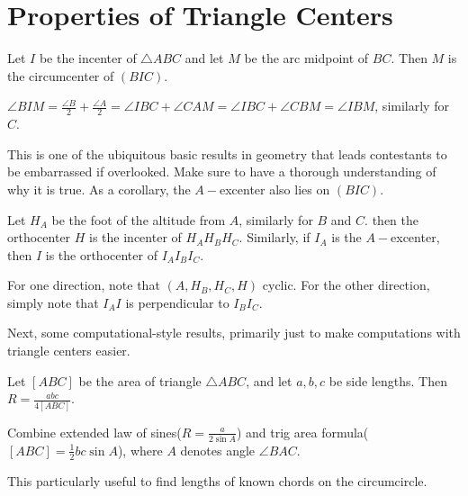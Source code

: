 \documentclass[mast]{lucky}
\begin{document}
\section{Properties of Triangle Centers}
\begin{theo}[Fact 5]
Let $I$ be the incenter of $\triangle ABC$ and let $M$ be the arc midpoint of $BC$. Then $M$ is the circumcenter of $(BIC)$.
\end{theo}
\begin{pro}
$\angle BIM = \frac{\angle B}2 + \frac{\angle A}2 = \angle IBC + \angle CAM = \angle IBC + \angle CBM = \angle IBM$, similarly for $C$.
\end{pro}
This is one of the ubiquitous basic results in geometry that leads contestants to be embarrassed if overlooked. Make sure to have a thorough understanding of why it is true. As a corollary, the $A-$excenter also lies on $(BIC)$.
\begin{exam}
Let $H_A$ be the foot of the altitude from $A$, similarly for $B$ and $C$. then the orthocenter $H$ is the incenter of $H_AH_BH_C$. Similarly, if $I_A$ is the $A-$excenter, then $I$ is the orthocenter of $I_AI_BI_C$.
\end{exam}
\begin{pro}
For one direction, note that $(A,H_B,H_C,H)$ cyclic. For the other direction, simply note that $I_AI$ is perpendicular to $I_BI_C$. 
\end{pro}
Next, some computational-style results, primarily just to make computations with triangle centers easier.
\begin{theo}
Let $[ABC]$ be the area of triangle $\triangle ABC$, and let $a,b,c$ be side lengths. Then $R = \frac{abc}{4[ABC]}$.
\end{theo}
\begin{pro}
Combine extended law of sines($R = \frac{a}{2\sin{A}}$) and trig area formula($[ABC] = \frac12 bc \sin{A}$), where $A$ denotes angle $\angle BAC$.
\end{pro}
This particularly useful to find lengths of known chords on the circumcircle.
\end{document}
